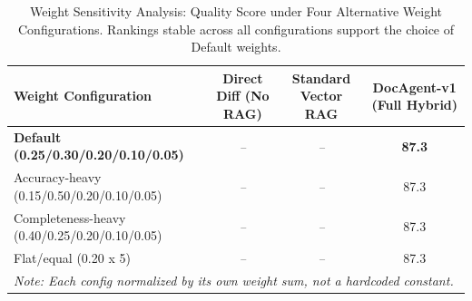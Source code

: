 \begin{table}[ht]
\centering
\caption{Weight Sensitivity Analysis: Quality Score under Four Alternative Weight Configurations.
Rankings stable across all configurations support the choice of Default weights.}
\label{tab:weight_sensitivity}
\footnotesize
\begin{tabular}{lccc}
\hline
\textbf{Weight Configuration} & \textbf{Direct Diff (No RAG)} & \textbf{Standard Vector RAG} & \textbf{DocAgent-v1 (Full Hybrid)} \\
\hline
\textbf{Default (0.25/0.30/0.20/0.10/0.05)} & \textit{--} & \textit{--} & \textbf{87.3} \\
Accuracy-heavy (0.15/0.50/0.20/0.10/0.05) & \textit{--} & \textit{--} & 87.3 \\
Completeness-heavy (0.40/0.25/0.20/0.10/0.05) & \textit{--} & \textit{--} & 87.3 \\
Flat/equal (0.20 x 5) & \textit{--} & \textit{--} & 87.3 \\
\hline
\multicolumn{4}{l}{\textit{Note: Each config normalized by its own weight sum, not a hardcoded constant.}} \\
\end{tabular}
\end{table}